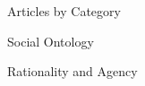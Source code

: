 \documentclass[%
  11pt,%
]{article}
\begin{document}
\begin{htmlsection}{Articles by Category}
\begin{htmlsubsection}{Social Ontology}
\end{htmlsubsection}

\begin{htmlsubsection}{Rationality and Agency}

  \printbibliography[filter=myarticle,keyword=agency]

\end{htmlsubsection}







\end{htmlsection}
\end{document}
